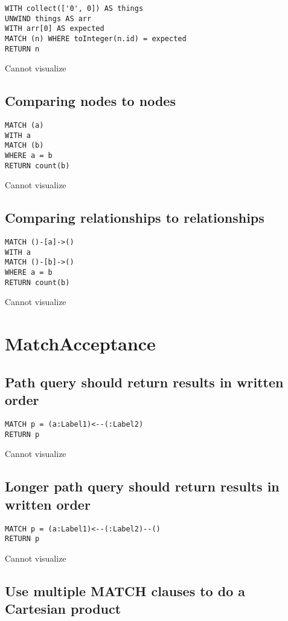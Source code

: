 \begin{lstlisting}
WITH collect(['0', 0]) AS things
UNWIND things AS arr
WITH arr[0] AS expected
MATCH (n) WHERE toInteger(n.id) = expected
RETURN n
\end{lstlisting}

Cannot visualize
\subsection{Comparing nodes to nodes}

\begin{lstlisting}
MATCH (a)
WITH a
MATCH (b)
WHERE a = b
RETURN count(b)
\end{lstlisting}

Cannot visualize
\subsection{Comparing relationships to relationships}

\begin{lstlisting}
MATCH ()-[a]->()
WITH a
MATCH ()-[b]->()
WHERE a = b
RETURN count(b)
\end{lstlisting}

Cannot visualize
\section{MatchAcceptance}

\subsection{Path query should return results in written order}

\begin{lstlisting}
MATCH p = (a:Label1)<--(:Label2)
RETURN p
\end{lstlisting}

Cannot visualize
\subsection{Longer path query should return results in written order}

\begin{lstlisting}
MATCH p = (a:Label1)<--(:Label2)--()
RETURN p
\end{lstlisting}

Cannot visualize
\subsection{Use multiple MATCH clauses to do a Cartesian product}

